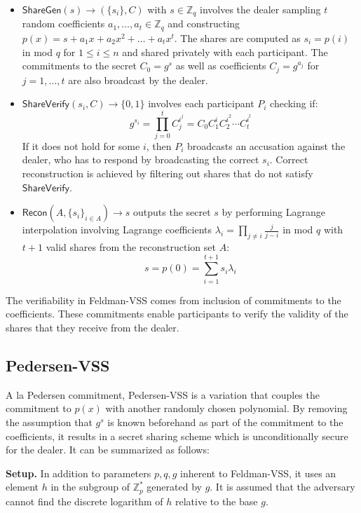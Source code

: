 \documentclass[letterpaper,twocolumn,10pt]{article}
\theoremstyle{definition}
\theoremstyle{remark}
\begin{document}
\begin{itemize}
\item $\mathsf{ShareGen}(s) \rightarrow (\{s_i\}, C)$ with $s \in \mathbb{Z}_q$ involves the dealer sampling $t$ random coefficients $a_1, \ldots, a_t \in \mathbb{Z}_q$ and constructing $p(x) = s + a_1x+ a_2x^2 +\ldots+a_tx^t$. The shares are computed as $s_i = p(i)$ in mod $q$ for $1\le i \le n$ and shared privately with each participant. The commitments to the secret $C_0 = g^s$ as well as coefficients $C_j = g^{a_j}$ for $j = 1,\ldots,t$ are also broadcast by the dealer.
\item $\mathsf{ShareVerify}(s_i, C) \rightarrow \{0, 1\}$ involves each participant $P_i$ checking if:
$$g^{s_i} = \prod_{j = 0}^{t} C_j^{i^j} = C_0 C_1^i C_2^{i^2} \cdots C_{t}^{i^{t}}$$
If it does not hold for some $i$, then $P_i$ broadcasts an accusation against the dealer, who has to respond by broadcasting the correct $s_i$. Correct reconstruction is achieved by filtering out shares that do not satisfy $\mathsf{ShareVerify}$.
\item $\mathsf{Recon}(A, \{s_i\}_{i \in A}) \rightarrow s$ outputs the secret $s$ by performing Lagrange interpolation involving Lagrange coefficients $\lambda_i = \prod_{j \neq i} \frac{j}{j - i}$ in mod $q$ with $t + 1$ valid shares from the reconstruction set $A$:
$$s = p(0) = \sum_{i = 1}^{t + 1} s_i \lambda_i$$
\end{itemize}

The verifiability in Feldman-VSS comes from inclusion of commitments to the coefficients. These commitments enable participants to verify the validity of the shares that they receive from the dealer.

\subsection{Pedersen-VSS}
\label{appendix:pedersenVSS}
A la Pedersen commitment, Pedersen-VSS is a variation that couples the commitment to $p(x)$ with another randomly chosen polynomial. By removing the assumption that $g^s$ is known beforehand as part of the commitment to the coefficients, it results in a secret sharing scheme which is unconditionally secure for the dealer. It can be summarized as follows:

\textbf{Setup.} In addition to parameters $p,q,g$ inherent to Feldman-VSS, it uses an element $h$ in the subgroup of $\mathbb{Z}^*_p$ generated by $g$. It is assumed that the adversary cannot find the discrete logarithm of $h$ relative to the base $g$.
\end{document}
